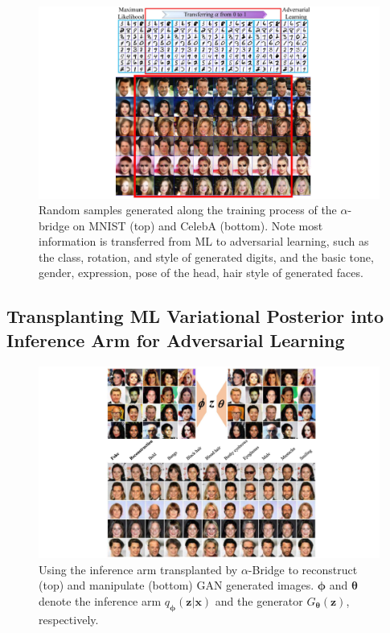 \documentclass[letterpaper]{article} %
\newcommand{\xv}[0]{\ensuremath{\boldsymbol{x}} }
\newcommand{\zv}[0]{\ensuremath{\boldsymbol{z}} }
\newcommand{\thetav}[0]{\ensuremath{\boldsymbol{\theta}} }
\newcommand{\phiv}[0]{\ensuremath{\boldsymbol{\phi}} }
\begin{document}
\begin{figure}[tb]
	\centering
		\includegraphics[width=\columnwidth]{Figures/MNIST_CelebA_transfer.pdf}
		\caption{Random samples generated along the training process of the $\alpha$-bridge on MNIST (top) and CelebA (bottom). 
			Note most information is transferred from ML to adversarial learning, such as the class, rotation, and style of generated digits, and the basic tone, gender, expression, pose of the head, hair style of generated faces.
		}
		\label{fig:Sample_MNIST_CelebA}
\end{figure}



\subsection{Transplanting ML Variational Posterior into Inference Arm for Adversarial Learning}



\begin{figure}[tb]
	\centering
		\includegraphics[width= \columnwidth]{Figures/Recon_Attribute_infer_CelebA.pdf}
		\caption{Using the inference arm transplanted by $\alpha$-Bridge to reconstruct (top) and manipulate (bottom) GAN generated images.
			$\phiv$ and $\thetav$ denote the inference arm $q_{\phiv}(\zv|\xv)$ and the generator $G_{\thetav}(\zv)$, respectively. 
		}
		\label{fig:attribute_inference_arm}
\end{figure}
\end{document}
